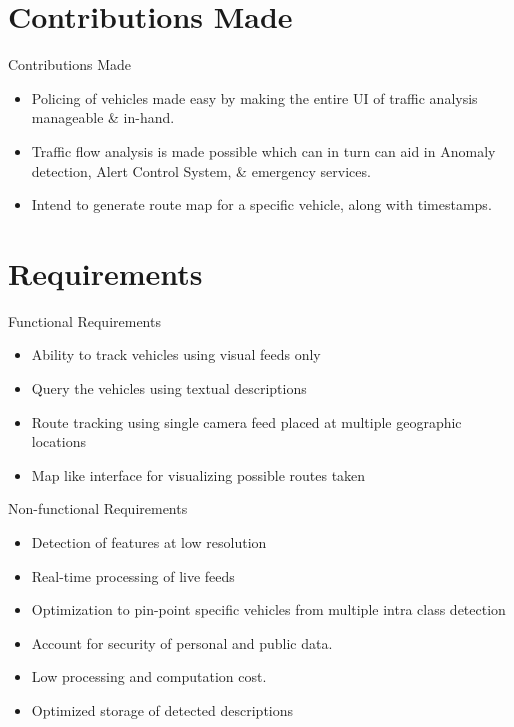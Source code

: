 \documentclass{beamer}
\begin{document}

\section{Contributions Made}
\begin{frame}{Contributions Made}
\begin{itemize}
    \item Policing of vehicles made easy by making the entire UI of traffic analysis manageable \& in-hand.
    \item Traffic flow analysis is made possible which can in turn can aid in Anomaly detection, Alert Control System, \& emergency services.
    \item Intend to generate route map for a specific vehicle, along with timestamps.    
\end{itemize}
\end{frame}


\section{Requirements}
\begin{frame}{Functional Requirements}
	\begin{itemize}
		\item Ability to track vehicles using visual feeds only
		\item Query the vehicles using textual descriptions
		\item Route tracking using single camera feed placed at multiple geographic locations
		\item Map like interface for visualizing possible routes taken
		
	\end{itemize}
\end{frame}

\begin{frame}{Non-functional Requirements}
    \begin{itemize}
        \item Detection of features at low resolution
        \item Real-time processing of live feeds
        \item Optimization to pin-point specific vehicles from multiple intra class detection
        \item Account for security of personal and public data.
        \item Low processing and computation cost.
        \item Optimized storage of detected descriptions
    \end{itemize}
\end{frame}
\end{document}
